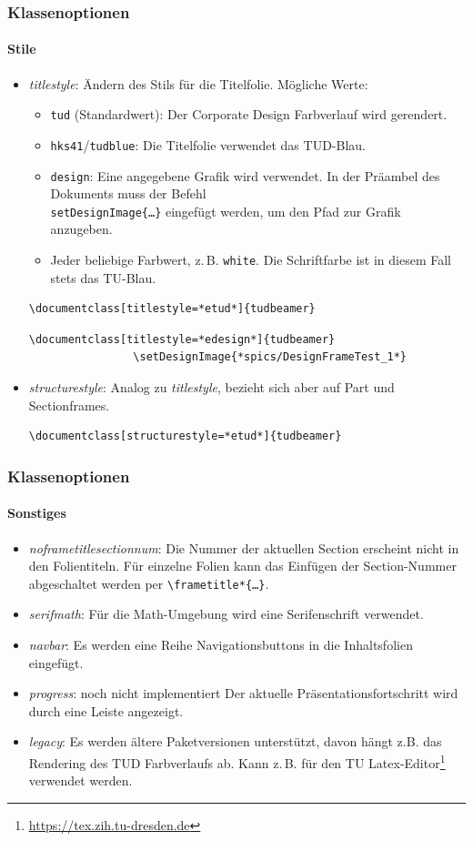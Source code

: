 \documentclass[german,notoc]{tudbeamer}%
\begin{document}
\begin{frame}[fragile]
	\frametitle{Klassenoptionen}
	\framesubtitle{Stile}
	\begin{itemize}
		\item \emph{titlestyle}: Ändern des Stils für die Titelfolie. Mögliche Werte:
			\begin{itemize}
				\item \texttt{tud} (Standardwert): Der Corporate Design Farbverlauf wird gerendert.
				\item \texttt{hks41}/\texttt{tudblue}: Die Titelfolie verwendet das TUD-Blau.
				\item \texttt{design}: Eine angegebene Grafik wird verwendet. In der Präambel des Dokuments muss der Befehl \texttt{\\setDesignImage\{\dots\}} eingefügt werden, um den Pfad zur Grafik anzugeben.
				\item Jeder beliebige Farbwert, z.\,B. \texttt{white}. Die Schriftfarbe ist in diesem Fall stets das TU-Blau.
			\end{itemize}
			\begin{lstlisting}[gobble=8,style=latex,numbers=none]
				\documentclass[titlestyle=*etud*]{tudbeamer}
			\end{lstlisting} 
			\begin{lstlisting}[gobble=8,style=latex]
				\documentclass[titlestyle=*edesign*]{tudbeamer}
				\setDesignImage{*spics/DesignFrameTest_1*}
			\end{lstlisting} 
		\item \emph{structurestyle}: Analog zu \emph{titlestyle}, bezieht sich aber auf Part und Sectionframes.
			\begin{lstlisting}[gobble=8,style=latex,numbers=none]
				\documentclass[structurestyle=*etud*]{tudbeamer}
			\end{lstlisting} 
	\end{itemize}
\end{frame}
\begin{frame}
	\frametitle{Klassenoptionen}
	\framesubtitle{Sonstiges}
	\begin{itemize}
		\item \emph{noframetitlesectionnum}: Die Nummer der aktuellen Section erscheint nicht in den Folientiteln. Für einzelne Folien kann das Einfügen der Section-Nummer abgeschaltet werden per \texttt{\textbackslash frametitle*\{\dots\}}.
		\item \emph{serifmath}: Für die Math-Umgebung wird eine Serifenschrift verwendet.
		\item \emph{navbar}: Es werden eine Reihe Navigationsbuttons in die Inhaltsfolien eingefügt.
		\item \emph{progress}: {\color{alert} noch nicht implementiert} Der aktuelle Präsentationsfortschritt wird durch eine Leiste angezeigt.
		\item \emph{legacy}: Es werden ältere Paketversionen unterstützt, davon hängt z.B. das Rendering des TUD Farbverlaufs ab. Kann z.\,B. für den TU Latex-Editor\footnote{\url{https://tex.zih.tu-dresden.de}} verwendet werden.
	\end{itemize}
\end{frame}
\end{document}
